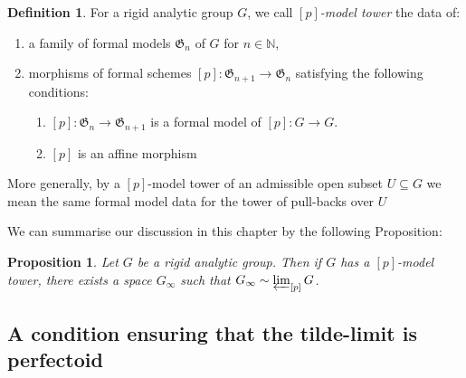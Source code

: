 \documentclass[11pt,oneside]{amsart}
\newtheorem{proposition}[theorem]{Proposition}
\theoremstyle{definition}
\newtheorem{definition}[theorem]{Definition}
\theoremstyle{remark}
\begin{document}
	\begin{definition}
		For a rigid analytic group $G$, we call \textit{$[p]$-model tower} the data of:
		\begin{enumerate}
			\item a family of formal models $\mathfrak G_n$ of $G$ for $n\in \mathbb N$,
			\item morphisms of formal schemes $[p]:\mathfrak G_{n+1}\rightarrow \mathfrak G_{n}$ satisfying the following conditions:
			\begin{enumerate}
				\item $[p]:\mathfrak G_n\rightarrow \mathfrak G_{n+1}$ is a formal model of $[p]:G\rightarrow G$. 
				\item $[p]$ is an affine morphism
			\end{enumerate}
		\end{enumerate}
	\end{definition}
	More generally, by a $[p]$-model tower of an admissible open subset $U\subseteq G$ we mean the same formal model data for the tower of pull-backs over $U$
	
	\begin{center}
	\end{center}
	
	We can summarise our discussion in this chapter by the following Proposition:
	\begin{proposition}
		Let $G$ be a rigid analytic group. Then if $G$ has a $[p]$-model tower, there exists a space $G_\infty$ such that $G_\infty \sim \varprojlim_{[p]}G$.
	\end{proposition}
	
	\subsection{A condition ensuring that the tilde-limit is perfectoid}
	
\end{document}
